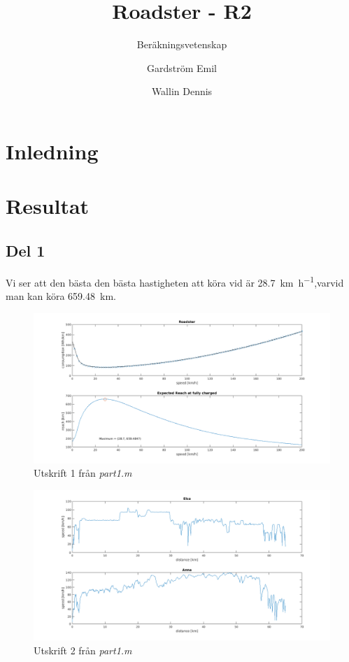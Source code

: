 \documentclass[]{scrreprt}
\title{Roadster - R2}
\author{Gardström Emil \and Wallin Dennis}
\subtitle{Beräkningsvetenskap \RON{1}}
\begin{document}
\maketitle
{}
%
\chapter{Inledning}
\chapter{Resultat}
\section{Del 1}
Vi ser att den bästa den bästa hastigheten att köra vid är \SI{28.7}{\kilo\meter\per\hour},varvid man kan köra \SI{659.48}{\kilo\meter}.
\begin{figure}
	\caption{Utskrift 1 från \textit{part1.m}}
	\includegraphics[width=1.2\textwidth]{roadster/roadstergraph.png}
\end{figure}
\begin{figure}
	\caption{Utskrift 2 från \textit{part1.m}}
	\includegraphics[width=1.2\textwidth]{roadster/elsa_anna.png}
\end{figure}
\end{document}
